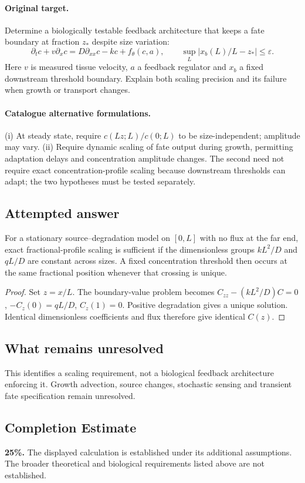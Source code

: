 \documentclass[11pt]{article}
\begin{document}
\paragraph{Original target.}
Determine a biologically testable feedback architecture that keeps a fate boundary at fraction $z_*$ despite size variation:
\[
\partial_t c+v\partial_xc=D\partial_{xx}c-kc+f_\theta(c,a),
\qquad
\sup_L\bigl|x_b(L)/L-z_*\bigr|\leq\varepsilon.
\]
Here $v$ is measured tissue velocity, $a$ a feedback regulator and $x_b$ a fixed downstream threshold boundary. Explain both scaling precision and its failure when growth or transport changes.
\paragraph{Catalogue alternative formulations.}
(i) At steady state, require $c(Lz;L)/c(0;L)$ to be size-independent; amplitude may vary. (ii) Require dynamic scaling of fate output during growth, permitting adaptation delays and concentration amplitude changes. The second need not require exact concentration-profile scaling because downstream thresholds can adapt; the two hypotheses must be tested separately.
\subsection{Attempted answer}
\begin{proposition}
For a stationary source--degradation model on $[0,L]$ with no flux at the far end, exact fractional-profile scaling is sufficient if the dimensionless groups $kL^2/D$ and $qL/D$ are constant across sizes. A fixed concentration threshold then occurs at the same fractional position whenever that crossing is unique.
\end{proposition}
\begin{proof}
Set $z=x/L$. The boundary-value problem becomes $C_{zz}-(kL^2/D)C=0$, $-C_z(0)=qL/D$, $C_z(1)=0$. Positive degradation gives a unique solution. Identical dimensionless coefficients and flux therefore give identical $C(z)$.
\end{proof}
\subsection{What remains unresolved}
This identifies a scaling requirement, not a biological feedback architecture enforcing it. Growth advection, source changes, stochastic sensing and transient fate specification remain unresolved.
\subsection{Completion Estimate}
\textbf{25\%.} The displayed calculation is established under its additional assumptions. The broader theoretical and biological requirements listed above are not established.
\end{document}
